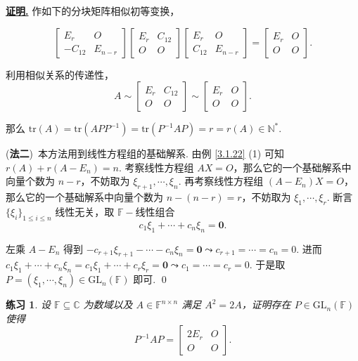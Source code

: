 \documentclass[10pt,openany]{article}
\theoremstyle{thmstyle} %
\newtheorem{practice}{练习}[section]
\theoremstyle{defstyle} %
\theoremstyle{prostyle} %
\theoremstyle{exastyle}
\theoremstyle{remstyle}
\renewenvironment{proof}[1][证明]{\par\underline{\textbf{#1.}} \;\fangsong}{\qed\par}
\newcommand{\F}{\mathbb{F}}
\newcommand{\gfn}{\text{GL}_n(\mathbb{F})}
\newcommand{\C}{\mathbb{C}}
\newcommand{\n}{^{n \times n}}
\newcommand{\tr}{\mathrm{tr}}
\begin{document}
\begin{proof}
     作如下的分块矩阵相似初等变换，
   
     \[ \begin{bmatrix}
     	E_r & O \\
     	-C_{12} & E_{n-r}
     \end{bmatrix}\begin{bmatrix}
     E_r & C_{12} \\
     O & O
     \end{bmatrix}\begin{bmatrix}
     E_r & O \\
     C_{12} & E_{n-r}
     \end{bmatrix}=\begin{bmatrix}
     E_r & O \\
     O & O
     \end{bmatrix}. \]
     
     利用相似关系的传递性，
     \[ A \sim \begin{bmatrix}
     	E_r & C_{12} \\
     	O & O
     \end{bmatrix} \sim \begin{bmatrix}
     E_r & O \\
     O & O
     \end{bmatrix}. \]
    
    那么 \( \tr(A)=\tr(APP^{-1})=\tr(P^{-1}AP)=r=r(A) \in \mathbb{N}^* \).
    
    (\textbf{法二})\ 本方法用到线性方程组的基础解系. 由例 \ref{3.1.22} (1) 可知 \( r(A)+r(A-E_n)=n \). 考察线性方程组 \( AX=O \)，那么它的一个基础解系中向量个数为 \( n-r \)，不妨取为 \( \xi_{r+1},\cdots,\xi_{n} \). 再考察线性方程组 \( (A-E_n)X=O \)，那么它的一个基础解系中向量个数为 \( n-(n-r)=r \)，不妨取为 \(\xi_1,\cdots,\xi_r \). 断言 \( \{\xi_i\}_{1 \leq i \leq n} \) 线性无关，取 \( \F-\)线性组合
    \[ c_1\xi_1+\cdots+c_n\xi_n=\bm{0}. \]
    
    左乘 \( A-E_n \) 得到 \( -c_{r+1}\xi_{r+1}-\cdots-c_n\xi_n=\bm{0} \leadsto c_{r+1}=\cdots=c_n=0 \). 进而 \( c_1\xi_1+\cdots+c_n\xi_n=c_1\xi_1+\cdots+c_r\xi_r=\bm{0} \leadsto c_1=\cdots=c_r=0 \). 于是取 \( P=(\xi_1,\cdots,\xi_n) \in \gfn \) 即可.
\end{proof}


\begin{practice} \label{prac3.17}
    设 \( \F \subseteq \C \) 为数域以及 \( A \in \F\n \) 满足 \( A^2=2A \)，证明存在 \( P \in \gfn \) 使得
     \[ P^{-1}AP=\begin{bmatrix}
	2E_r & O \\
	O & O
    \end{bmatrix}. \]
\end{practice}
\end{document}
